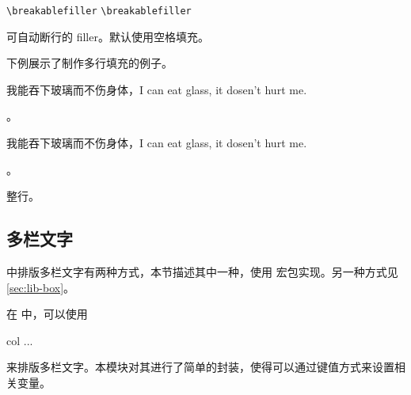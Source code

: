 \documentclass{whudoc}
\begin{document}
\begin{function}{\breakablefiller}
  \begin{syntax}
    \verb|\breakablefiller|
    \verb|\breakablefiller| 
  \end{syntax}
可自动断行的 filler。默认使用空格填充。
\end{function}

\begin{xample}
 \breakablefiller[cdotted=1em] 

 \breakablefiller[cdotted=1em] 
\stopxamplecode
\xampleprint
\end{xample}

下例展示了制作多行填充的例子。
\begin{xample}
\newcommand\filllines[4][]{{%
  #2\filler[#1]%
  \Replicate{#3-1}{\break \rule{0pt}{0.7\baselineskip}\filler[#1]}%
  #4\par}}

我能吞下玻璃而不伤身体，I can eat glass, it dosen't hurt me.
\filllines{\linespread{2}\selectfont}{3}{。\hspace*{1em}}

我能吞下玻璃而不伤身体，I can eat glass, it dosen't hurt me.
\filllines[color=red,dotted]{\linespread{2}\selectfont}{3}{。\hspace*{1em}}

\filllines [raise=-.5ex]{\linespread{2}\selectfont \noindent\strut}{3}{ 整行。\hspace*{1em}}
\stopxamplecode
\xampleprint  
\end{xample}


\subsection{多栏文字}\label{sec:multicol}

\WhuTeX 中排版多栏文字有两种方式，本节描述其中一种，使用  宏包实现。另一种方式见\cref{sec:lib-box}。

在  中，可以使用 
\begin{xample}
\begin{multicols}{col}
  ... 
\end{multicols}
\stopxamplecode 
\xamplecode \medskip 
\end{xample}
来排版多栏文字。本模块对其进行了简单的封装，使得可以通过键值方式来设置相关变量。
\end{document}
